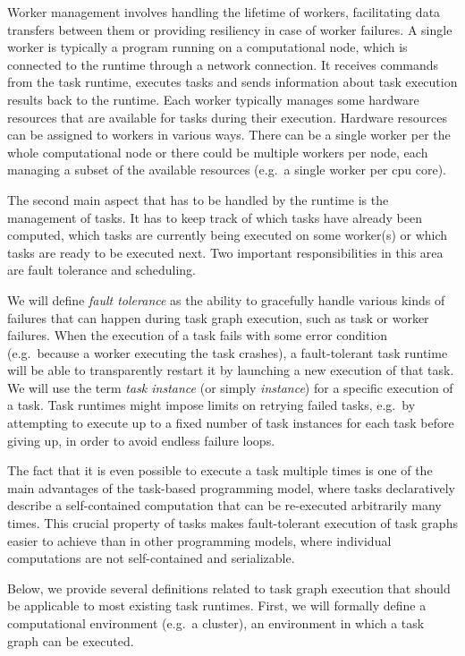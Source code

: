Worker management involves handling the lifetime of workers, facilitating data transfers between
them or providing resiliency in case of worker failures. A single worker is typically a program
running on a computational node, which is connected to the runtime through a network connection. It
receives commands from the task runtime, executes tasks and sends information about task execution
results back to the runtime. Each worker typically manages some hardware resources that are
available for tasks during their execution. Hardware resources can be assigned to workers in
various ways. There can be a single worker per the whole computational node or there could be
multiple workers per node, each managing a subset of the available resources (e.g.\ a single worker
per \gls{cpu} core).

The second main aspect that has to be handled by the runtime is the management of tasks. It has to
keep track of which tasks have already been computed, which tasks are currently being executed on
some worker(s) or which tasks are ready to be executed next. Two important responsibilities in this
area are fault tolerance and scheduling.

We will define \emph{fault tolerance} as the ability to gracefully handle various kinds of
failures that can happen during task graph execution, such as task or worker failures. When the
execution of a task fails with some error condition (e.g.\ because a worker executing the task
crashes), a fault-tolerant task runtime will be able to transparently restart it by launching a new
execution of that task. We will use the term \emph{task instance} (or simply \emph{instance}) for a specific execution of a
task. Task runtimes might impose limits on retrying failed tasks, e.g.\ by attempting to execute up
to a fixed number of task instances for each task before giving up, in order to avoid endless
failure loops.

The fact that it is even possible to execute a task multiple times is one of the main advantages of
the task-based programming model, where tasks declaratively describe a self-contained computation
that can be re-executed arbitrarily many times. This crucial property of tasks makes fault-tolerant
execution of task graphs easier to achieve than in other programming models, where individual
computations are not self-contained and serializable.

Below, we provide several definitions related to task graph execution that should be
applicable to most existing task runtimes. First, we will formally define a computational environment
(e.g.\ a cluster), an environment in which a task graph can be executed.

